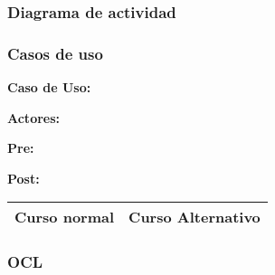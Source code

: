 \subsubsection{Diagrama de actividad}

\begin{figure}[H]
\centering
\end{figure}

\subsubsection{Casos de uso}


\textbf{Caso de Uso: }

\textbf{Actores:} 

\textbf{Pre:} 

\textbf{Post:}
\begin{table}[h!]
	
 \begin{tabular}{|p{7.5cm} | p{7.5cm}|} 
 \hline
 \textbf{Curso normal} & \textbf{Curso Alternativo} \\
 \hline

 \end{tabular}

\end{table}


\subsubsection{OCL}